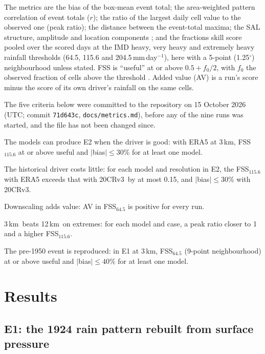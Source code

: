 \documentclass[11pt,a4paper]{article}
\newcommand{\twcr}{20CRv3}
\newcommand{\km}{\,km}
\newcommand{\mm}{\,mm}
\begin{document}
The metrics are the bias of the box-mean event total; the area-weighted pattern correlation
of event totals ($r$); the ratio of the largest daily cell value to the observed one (peak
ratio); the distance between the event-total maxima; the SAL structure, amplitude and
location components \citep{wernli2008}; and the fractions skill score
\citep[FSS;][]{roberts2008} pooled over the scored days at the IMD heavy, very heavy and
extremely heavy rainfall thresholds (64.5, 115.6 and 204.5\mm\,day$^{-1}$), here with a
5-point (1.25$^\circ$) neighbourhood unless stated. FSS is ``useful'' at or above
$0.5 + f_0/2$, with $f_0$ the observed fraction of cells above the threshold
\citep{roberts2008}. Added value (AV) is a run's score minus the score of its own driver's
rainfall on the same cells.

The five criteria below were committed to the repository on 15 October 2026 (UTC; commit
\texttt{71d643c}, \texttt{docs/metrics.md}), before any of the nine runs was started, and
the file has not been changed since.
\begin{description}[leftmargin=2.2em,style=sameline,font=\normalfont\bfseries]
\item[H1] The models can produce E2 when the driver is good: with ERA5 at 3\km,
  FSS$_{115.6}$ at or above useful and $|$bias$|\le 30$\% for at least one model.
\item[H2] The historical driver costs little: for each model and resolution in E2, the
  FSS$_{115.6}$ with ERA5 exceeds that with \twcr\ by at most 0.15, and $|$bias$|\le 30$\%
  with \twcr.
\item[H3] Downscaling adds value: AV in FSS$_{64.5}$ is positive for every run.
\item[H4] 3\km\ beats 12\km\ on extremes: for each model and case, a peak ratio closer to 1
  and a higher FSS$_{115.6}$.
\item[H5] The pre-1950 event is reproduced: in E1 at 3\km, FSS$_{64.5}$ (9-point
  neighbourhood) at or above useful and $|$bias$|\le 40$\% for at least one model.
\end{description}

\section{Results}

\subsection{E1: the 1924 rain pattern rebuilt from surface pressure}
\end{document}

